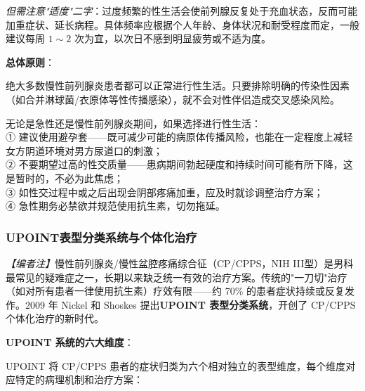\noindent\textit{但需注意"适度"二字}：过度频繁的性生活会使前列腺反复处于充血状态，反而可能加重症状、延长病程。具体频率应根据个人年龄、身体状况和耐受程度而定，一般建议每周 $1\sim2$ 次为宜，以次日不感到明显疲劳或不适为度。

\vspace{0.5em}
\noindent\textbf{总体原则}：

绝大多数慢性前列腺炎患者都可以正常进行性生活。只要排除明确的传染性因素（如合并淋球菌/衣原体等性传播感染），就不会对性伴侣造成交叉感染风险。

\begin{tcolorbox}[colback=pink!5!white,colframe=red!50!black,title=贴心小叮咛]
无论是急性还是慢性前列腺炎期间，如果选择进行性生活：\\
① 建议使用避孕套——既可减少可能的病原体传播风险，也能在一定程度上减轻女方阴道环境对男方尿道口的刺激；\\
② 不要期望过高的性交质量——患病期间勃起硬度和持续时间可能有所下降，这是暂时的，不必为此焦虑；\\
③ 如性交过程中或之后出现会阴部疼痛加重，应及时就诊调整治疗方案；\\
④ 急性期务必禁欲并规范使用抗生素，切勿拖延。
\end{tcolorbox}

\subsubsection{UPOINT表型分类系统与个体化治疗}
\label{subsec:upoint}

\noindent\textit{【编者注】}慢性前列腺炎/慢性盆腔疼痛综合征（CP/CPPS，NIH III型）是男科最常见的疑难症之一，长期以来缺乏统一有效的治疗方案。传统的"一刀切"治疗（如对所有患者一律使用抗生素）疗效有限——约 70\% 的患者症状持续或反复发作。2009 年 Nickel 和 Shoskes 提出\textbf{UPOINT 表型分类系统}，开创了 CP/CPPS 个体化治疗的新时代。

\vspace{0.5em}
\noindent\textbf{UPOINT 系统的六大维度}：

UPOINT 将 CP/CPPS 患者的症状归类为六个相对独立的表型维度，每个维度对应特定的病理机制和治疗方案：

